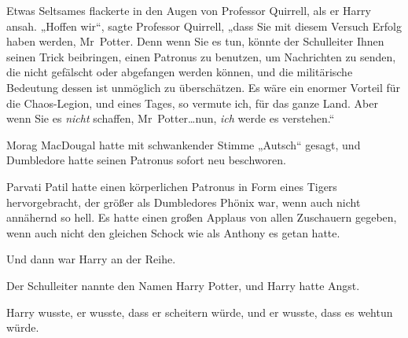 Etwas Seltsames flackerte in den Augen von Professor Quirrell, als er Harry ansah. „Hoffen wir“, sagte Professor Quirrell, „dass Sie mit diesem Versuch Erfolg haben werden, Mr~Potter. Denn wenn Sie es tun, könnte der Schulleiter Ihnen seinen Trick beibringen, einen Patronus zu benutzen, um Nachrichten zu senden, die nicht gefälscht oder abgefangen werden können, und die militärische Bedeutung dessen ist unmöglich zu überschätzen. Es wäre ein enormer Vorteil für die Chaos-Legion, und eines Tages, so vermute ich, für das ganze Land. Aber wenn Sie es \emph{nicht} schaffen, Mr~Potter…nun, \emph{ich} werde es verstehen.“

\later

Morag MacDougal hatte mit schwankender Stimme „Autsch“ gesagt, und Dumbledore hatte seinen Patronus sofort neu beschworen.

Parvati Patil hatte einen körperlichen Patronus in Form eines Tigers hervorgebracht, der größer als Dumbledores Phönix war, wenn auch nicht annähernd so hell. Es hatte einen großen Applaus von allen Zuschauern gegeben, wenn auch nicht den gleichen Schock wie als Anthony es getan hatte.

Und dann war Harry an der Reihe.

Der Schulleiter nannte den Namen Harry Potter, und Harry hatte Angst.

Harry wusste, er wusste, dass er scheitern würde, und er wusste, dass es wehtun würde.

